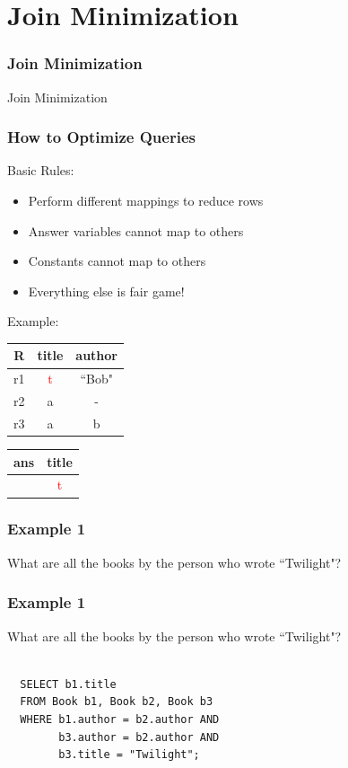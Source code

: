 \documentclass{beamer}
\begin{document}
\section{Join Minimization}
\begin{frame}
  \frametitle{Join Minimization}
  \begin{itemize}
  Join Minimization
  \end{itemize}
\end{frame}
\begin{frame}
  \frametitle{How to Optimize Queries}
  Basic Rules:
  \begin{itemize}
    \item Perform different mappings to reduce rows
    \item Answer variables cannot map to others
    \item Constants cannot map to others
    \item Everything else is fair game!
  \end{itemize}
Example:
  
  \begin{tabular}{ c | c c }
  R & title & author \\
  \hline
  r1 & \textcolor{red}{t} & ``Bob" \\
  r2 & a & - \\
  r3 & a & b
  \end{tabular}  
  \begin{tabular}{c|c}
  ans & title\\
  \hline 
  & \textcolor{red}{t} 
  \end{tabular}
\end{frame}

\begin{frame}
  \frametitle{Example 1}
  What are all the books by the person who wrote ``Twilight"?
\end{frame}

\begin{frame}[fragile]
  \frametitle{Example 1}
  What are all the books by the person who wrote ``Twilight"?\\
  \hfill \\
\begin{verbatim} 
  SELECT b1.title
  FROM Book b1, Book b2, Book b3
  WHERE b1.author = b2.author AND
        b3.author = b2.author AND
        b3.title = "Twilight";
\end{verbatim}

\end{frame}
\end{document}
